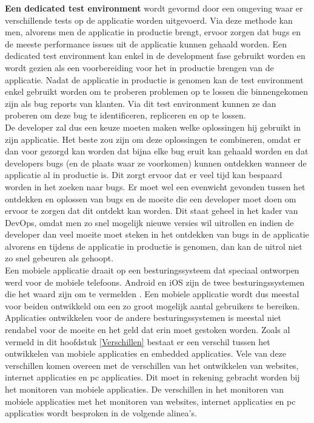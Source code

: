 \textbf{Een dedicated test environment} wordt gevormd door een omgeving waar er verschillende tests op de applicatie worden uitgevoerd. Via deze methode kan men, alvorens men de applicatie in productie brengt, ervoor zorgen dat bugs en de meeste performance issues uit de applicatie kunnen gehaald worden. Een dedicated test environment kan enkel in de development fase gebruikt worden en wordt gezien als een voorbereiding voor het in productie brengen van de applicatie. Nadat de applicatie in productie is genomen kan de test environment enkel gebruikt worden om te proberen problemen op te lossen die binnengekomen zijn als bug reports van klanten. Via dit test environment kunnen ze dan proberen om deze bug te identificeren, repliceren en op te lossen. \\

De developer zal dus een keuze moeten maken welke oplossingen hij gebruikt in zijn applicatie. Het beste zou zijn om deze oplossingen te combineren, omdat er dan voor gezorgd kan worden dat bijna elke bug eruit kan gehaald worden en dat developers bugs (en de plaats waar ze voorkomen) kunnen ontdekken wanneer de applicatie al in productie is. Dit zorgt ervoor dat er veel tijd kan bespaard worden in het zoeken naar bugs. Er moet wel een evenwicht gevonden tussen het ontdekken en oplossen van bugs en de moeite die een developer moet doen om ervoor te zorgen dat dit ontdekt kan worden. Dit staat geheel in het kader van DevOps, omdat men zo snel mogelijk nieuwe versies wil uitrollen en indien de developer dan veel moeite moet steken in het ontdekken van bugs in de applicatie alvorens en tijdens de applicatie in productie is genomen, dan kan de uitrol niet zo snel gebeuren als gehoopt.\\


Een mobiele applicatie draait op een besturingssysteem dat speciaal ontworpen werd voor de mobiele telefoons. Android en iOS zijn de twee besturingssystemen die het waard zijn om te vermelden \cite{MarketShare}. Een mobiele applicatie wordt dus meestal voor beiden ontwikkeld om een zo groot mogelijk aantal gebruikers te bereiken. Applicaties ontwikkelen voor de andere besturingssystemen is meestal niet rendabel voor de moeite en het geld dat erin moet gestoken worden. Zoals al vermeld in dit hoofdstuk \ref{Verschillen} bestaat er een verschil tussen het ontwikkelen van mobiele applicaties en embedded applicaties. Vele van deze verschillen komen overeen met de verschillen van het ontwikkelen van websites, internet applicaties en pc applicaties. Dit moet in rekening gebracht worden bij het monitoren van mobiele applicaties. De verschillen in het monitoren van mobiele applicaties met het monitoren van websites, internet applicaties en pc applicaties wordt besproken in de volgende alinea's.\\

